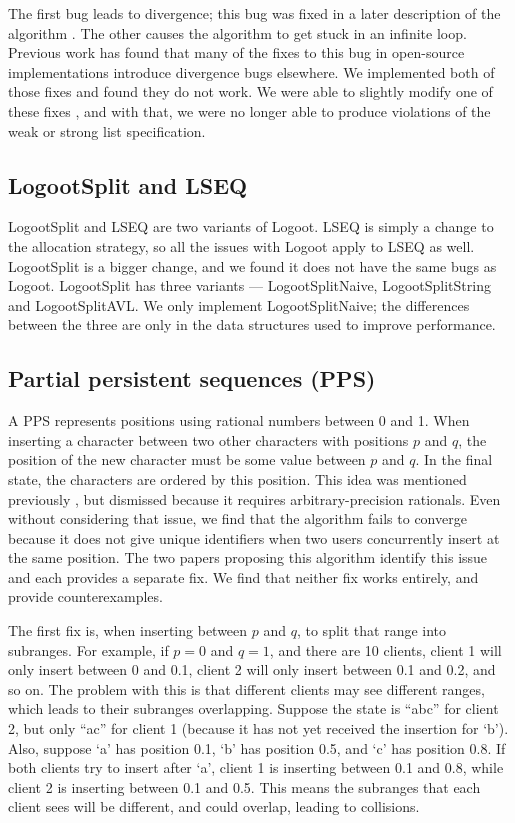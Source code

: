 \documentclass[sigplan,10pt,review,anonymous]{acmart}
\begin{document}
The first bug leads to divergence; this bug was fixed in a later description of the algorithm \cite{Weiss2010}. The other causes the algorithm to get stuck in an infinite loop. Previous work has found that many of the fixes to this bug in open-source implementations \cite{Urso2016, Chen2017} introduce divergence bugs
elsewhere. We implemented both of those fixes and found they do not work. We were able to slightly modify one of these fixes \cite{Chen2017}, and with that, we were no longer able to produce violations of the weak or strong list specification.

\subsection{LogootSplit and LSEQ}

LogootSplit \cite{Andre2013} and LSEQ \cite{Nedelec2013} are two variants of Logoot. LSEQ is simply a change to the allocation strategy, so all the issues with Logoot apply to LSEQ as well. LogootSplit is a bigger change, and we found it does not have the same bugs as Logoot. LogootSplit has three variants --- LogootSplitNaive, LogootSplitString and LogootSplitAVL. We only implement LogootSplitNaive; the differences between the three are only in the data structures used to improve performance.

\subsection{Partial persistent sequences (PPS)} \label{sec:ppsimplementation}

A PPS \cite{Wu2010} represents positions using rational numbers between 0 and 1. When inserting a character between two other characters with positions $p$ and $q$, the position of the new character must be some value between $p$ and $q$. In the final state, the characters are ordered by this position. This idea was mentioned previously \cite{Preguica2009}, but dismissed because it requires arbitrary-precision rationals. Even without considering that issue, we find that the algorithm fails to converge because it does not give unique identifiers when two users concurrently insert at the same position. The two papers proposing this algorithm \cite{Wu2009, Wu2010} identify this issue and each provides a separate fix. We find that neither fix works entirely, and provide counterexamples.  

The first fix is, when inserting between $p$ and $q$, to split that range into subranges. For example, if $p=0$ and $q=1$, and there are 10 clients, client 1 will only insert between 0 and 0.1, client 2 will only insert between 0.1 and 0.2, and so on. The problem with this is that different clients may see different ranges, which leads to their subranges overlapping. Suppose the state is ``abc'' for client 2, but only ``ac'' for client 1 (because it has not yet received the insertion for `b'). Also, suppose `a' has position 0.1, `b' has position 0.5, and `c' has position 0.8. If both clients try to insert after `a', client 1 is inserting between 0.1 and 0.8, while client 2 is inserting between 0.1 and 0.5. This means the subranges that each client sees will be different, and could overlap, leading to collisions.
\end{document}
